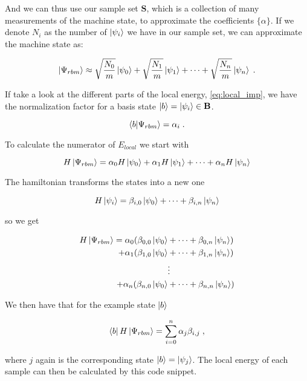 And we can thus use our sample set $\mathbf{S}$, which is a collection of many measurements of the machine state, to approximate the coefficients $\{\alpha\}$. If we denote $N_i$ as the number of $\ket{\psi_i}$ we have in our sample set, we can approximate the machine state as:

\begin{equation}
  \ket{\Psi_{rbm}} \approx \sqrt{\frac{N_0}{m}}\ket{\psi_0} +\sqrt{\frac{N_1}{m}}\ket{\psi_1} +\dots + \sqrt{\frac{N_n}{m}}\ket{\psi_n} \; .
\end{equation}

If take a look at the different parts of the local energy, \ref{eq:local_imp}, we have the normalization factor for a basis state $\ket{b} = \ket{\psi_i} \in \mathbf{B}$.

$$\braket{b}{\Psi_{rbm}} = \alpha_i \; .$$


To calculate the numerator of $E_{local}$ we start with

\begin{equation}
  H\ket{\Psi_{rbm}} =  \alpha_0H\ket{\psi_0} + \alpha_1H\ket{\psi_1} + \dots + \alpha_nH\ket{\psi_n}
\end{equation}

The hamiltonian transforms the states into a new one

\begin{equation}
  H\ket{\psi_i} = \beta_{i,0}\ket{\psi_0} + \dots + \beta_{i,n}\ket{\psi_n}
\end{equation}

so we get

\begin{align}
  H\ket{\Psi_{rbm}} = \alpha_0  ( \beta_{0,0}\ket{\psi_0} &+ \dots + \beta_{0,n}\ket{\psi_n}  ) \\
 + \alpha_1  ( \beta_{1,0}\ket{\psi_0} &+ \dots + \beta_{1,n}\ket{\psi_n}  ) \\
&\vdots \\
+ \alpha_n  ( \beta_{n,0}\ket{\psi_0} &+ \dots + \beta_{n,n}\ket{\psi_n}  ) 
\end{align}

We then have that for the example state $\ket{b}$

\begin{equation}
  \bra{b}H\ket{\Psi_{rbm}} = \sum_{i=0}^n \alpha_j\beta_{i,j} \; ,
\end{equation}

where $j$ again is the corresponding state $\ket{b} = \ket{\psi_j}$. The local energy of each sample can then be calculated by this code snippet.

